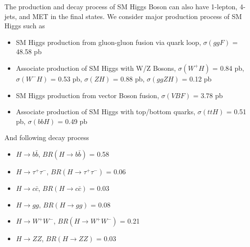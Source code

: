 
The production and decay process of SM Higgs Boson can also have 1-lepton, 4-jets, and MET
in the final states. We consider major production process of SM Higgs such as 
\begin{itemize}
    \item SM Higgs production from gluon-gluon fusion via quark loop, $\sigma(ggF)$ = 48.58 pb
    \item Associate production of SM Higgs with W/Z Bosons, $\sigma(W^+H)$ = 0.84 pb, $\sigma(W^-H)$
        = 0.53 pb, $\sigma (ZH)$ = 0.88 pb, $\sigma(ggZH)$ = 0.12 pb
    \item SM Higgs production from vector Boson fusion, $\sigma (VBF)$ = 3.78 pb
    \item Associate production of SM Higgs with top/bottom quarks, $\sigma (ttH)$ = 0.51
        pb, $\sigma(bbH)$ = 0.49 pb
\end{itemize}
And following decay process
\begin{itemize}
    \item $H\rightarrow b\bar{b}$, $BR(H\rightarrow b\bar{b})$ = 0.58 
    \item $H\rightarrow \tau^+ \tau^-$, $BR(H\rightarrow \tau^+ \tau^-)$ = 0.06
    \item $H\rightarrow c\bar{c}$, $BR(H\rightarrow c\bar{c})$ = 0.03 
    \item $H\rightarrow gg$, $BR(H\rightarrow gg)$ = 0.08
    \item $H\rightarrow W^+W^-$, $BR(H\rightarrow W^+W^-)$ = 0.21
    \item $H\rightarrow ZZ$, $BR(H\rightarrow ZZ)$ = 0.03
\end{itemize}


